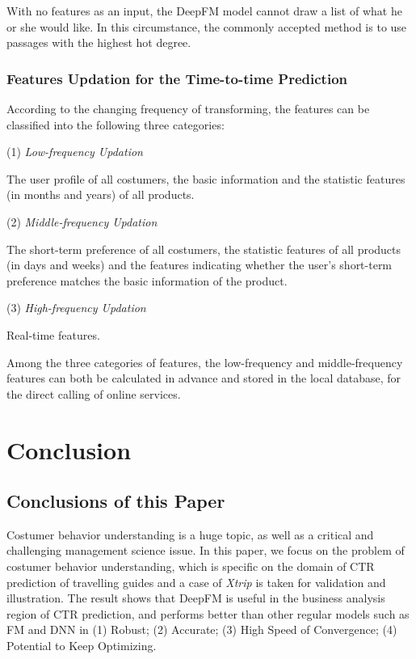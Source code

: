 \documentclass{article}
\begin{document}
    With no features as an input, the DeepFM model cannot draw a list of what he or she would like. In this circumstance, the commonly accepted method is to use passages with the highest hot degree.

    \subsubsection{Features Updation for the Time-to-time Prediction}
    According to the changing frequency of transforming, the features can be classified into the following three categories:

    (1) \emph{Low-frequency Updation}

    The user profile of all costumers, the basic information and the statistic features (in months and years) of all products. 

    (2) \emph{Middle-frequency Updation}

    The short-term preference of all costumers, the statistic features of all products (in days and weeks) and the features indicating whether the user's short-term preference matches the basic information of the product.

    (3) \emph{High-frequency Updation}

    Real-time features. 

    Among the three categories of features, the low-frequency and middle-frequency features can both be calculated in advance and stored in the local database, for the direct calling of online services. 

    \newpage
	\section{Conclusion}
	\label{sec:method}

    \subsection{Conclusions of this Paper}
    Costumer behavior understanding is a huge topic, as well as a critical and challenging management science issue. In this paper, we focus on the problem of costumer behavior understanding, which is specific on the domain of CTR prediction of travelling guides and a case of \emph{Xtrip} is taken for validation and illustration. The result shows that DeepFM is useful in the business analysis region of CTR prediction, and performs better than other regular models such as FM and DNN in (1) Robust; (2) Accurate; (3) High Speed of Convergence; (4) Potential to Keep Optimizing. 
\end{document}
